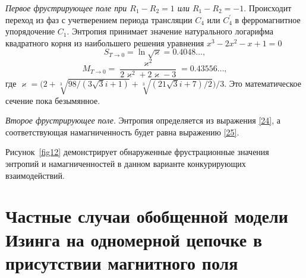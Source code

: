 
\emph{Первое фрустрирующее поле при $R_1 - R_2 = 1$ или $R_1 - R_2 = -1$}. Происходит переход из фаз с учетверением периода трансляции $C_4$ или $C_4^{'}$ в ферромагнитное упорядочение $C_1$. Энтропия принимает значение натурального логарифма квадратного корня из наибольшего решения уравнения \mbox{$x^3-2x^2-x+1=0$}
\begin{equation}
S_{T\rightarrow 0} = \ln \sqrt{\varkappa} = 0.4048\dots,
\label{37}
\end{equation}
\begin{equation}
M_{T\rightarrow 0} = \frac{\varkappa^2}{2\varkappa^2+2\varkappa-3} = 0.43556\dots,
\label{38}
\end{equation}
где $\varkappa = \Big(2+\sqrt[3]{98/(3\sqrt{3}i+1)}+\sqrt[3]{(21\sqrt{3}i+7)/2}\Big)/3$. Это математическое сечение пока безымянное.

\emph{Второе фрустрирующее поле}. Энтропия определяется из выражения \eqref{24}, а соответствующая намагниченность будет равна выражению \eqref{25}.

Рисунок~\ref{fig12} демонстрирует обнаруженные фрустрационные значения энтропий и намагниченностей в данном варианте конкурирующих взаимодействий.

\section{Частные случаи обобщенной модели Изинга на одномерной цепочке в присутствии магнитного поля}

